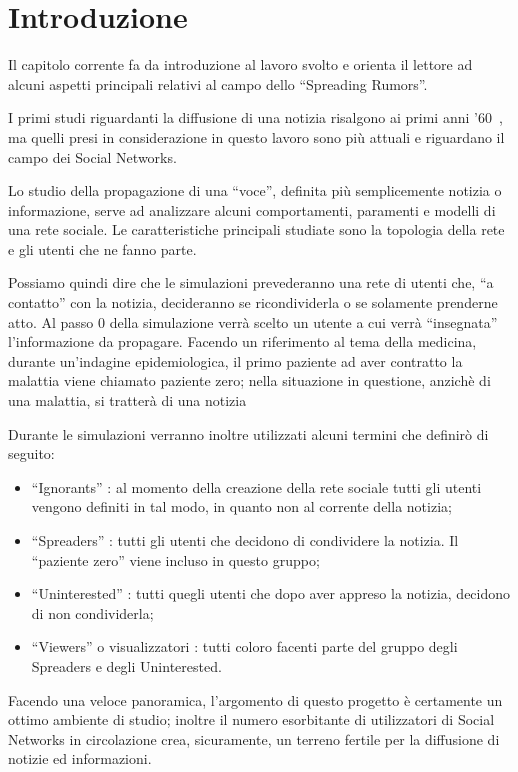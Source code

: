 \section{Introduzione}
\label{section:introduzione}

Il capitolo corrente fa da introduzione al lavoro svolto e orienta il lettore 
ad alcuni aspetti principali relativi al campo dello ``Spreading Rumors''.

I primi studi riguardanti la diffusione di una notizia risalgono ai primi anni '60~\cite{biblio:stochastic_rumours}, 
ma quelli presi in considerazione in questo lavoro sono più attuali e riguardano il campo dei Social Networks.

Lo studio della propagazione di una ``voce'', definita più semplicemente notizia o informazione, 
serve ad analizzare alcuni comportamenti, paramenti e modelli di una rete sociale.
Le caratteristiche principali studiate sono la topologia della rete e gli utenti che ne fanno parte.

Possiamo quindi dire che le simulazioni prevederanno una rete di utenti che, ``a contatto'' con
la notizia, decideranno se ricondividerla o se solamente prenderne atto.
Al passo 0 della simulazione verrà scelto un utente a cui verrà ``insegnata'' l'informazione da propagare. 
Facendo un riferimento al tema della medicina, durante un'indagine epidemiologica, il primo paziente ad aver 
contratto la malattia viene chiamato paziente zero; nella situazione in questione, anzichè di una malattia, si tratterà di una notizia

Durante le simulazioni verranno inoltre utilizzati alcuni termini che definirò di seguito:
\begin{itemize}
 \item ``Ignorants''\cite{biblio:spread_rumor} : al momento della creazione della rete sociale tutti gli utenti vengono definiti 
 in tal modo, in quanto non al corrente della notizia;
 \item ``Spreaders''\cite{biblio:spread_rumor} : tutti gli utenti che decidono di condividere la notizia. 
 Il ``paziente zero'' viene incluso in questo gruppo;
 \item ``Uninterested'' : tutti quegli utenti che dopo aver appreso la notizia, decidono di non condividerla;
 \item ``Viewers'' o visualizzatori : tutti coloro facenti parte del gruppo degli Spreaders e degli Uninterested.
\end{itemize}

Facendo una veloce panoramica, l'argomento di questo progetto è certamente un ottimo ambiente di studio; 
inoltre il numero esorbitante di utilizzatori di Social Networks in circolazione crea, sicuramente, 
un terreno fertile per la diffusione di notizie ed informazioni.



